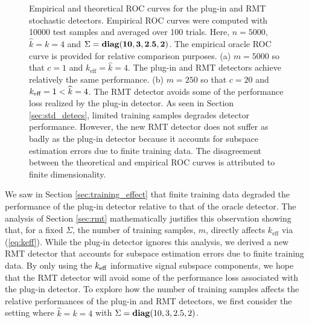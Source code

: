 \begin{figure}
\centering
{}
\vspace{-0.1in}
\caption{Empirical and theoretical ROC curves for the plug-in and RMT stochastic detectors. Empirical ROC curves were computed with 10000 test samples and averaged over 100 trials. Here, $n=5000$, $\widehat{k}=k=4$ and $\Sigma = \mathop{\bf diag}({\bf{10,3,2.5,2}})$. The empirical oracle ROC curve is provided for relative comparison purposes. (a) $m=5000$ so that $c=1$ and $k_\text{eff}=\widehat{k}=4$. The plug-in and RMT detectors achieve relatively the same performance. (b) $m=250$ so that $c=20$ and $k_\text{eff}=1<\widehat{k}=4$. The RMT detector avoids some of the performance loss realized by the plug-in detector. As seen in Section \ref{sec:std_detecs}, limited training samples degrades detector performance. However, the new RMT detector does not suffer as badly as the plug-in detector because it accounts for subspace estimation errors due to finite training data. The disagreement between the theoretical and empirical ROC curves is attributed to finite dimensionality.}
\label{fig:stoch_m_effect}
\vspace{-0.3in}
\end{figure}

We saw in Section \ref{sec:training_effect} that finite training data degraded the performance of the plug-in detector relative to that of the oracle detector. The analysis of Section \ref{sec:rmt} mathematically justifies this observation showing that, for a fixed $\Sigma$, the number of training samples, $m$, directly affects $k_\text{eff}$ via (\ref{eq:keff}). While the plug-in detector ignores this analysis, we derived a new RMT detector that accounts for subspace estimation errors due to finite training data. By only using the $k_\text{eff}$ informative signal subspace components, we hope that the RMT detector will avoid some of the performance loss associated with the plug-in detector. To explore how the number of training samples affects the relative performances of the plug-in and RMT detectors, we first consider the setting where $\widehat{k}=k=4$ with $\Sigma=\mathop{\bf diag}(10,3,2.5,2)$. 

